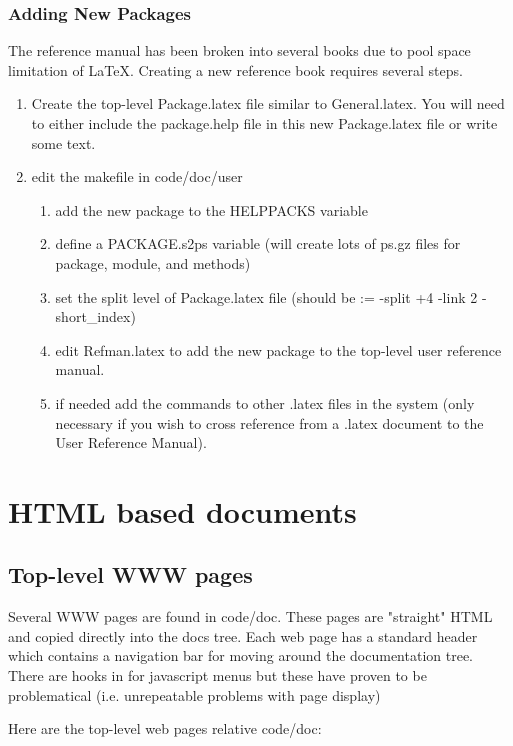 \subsubsection{Adding New Packages}
The reference manual has been broken into several books due to pool space limitation of
LaTeX.  Creating a new reference book requires several steps.
\begin{enumerate}
\item Create the top-level Package.latex file similar to General.latex. You will need to either
include the package.help file in this new Package.latex file or write some text.
\item edit the makefile in code/doc/user
\begin{enumerate}
 \item add the new package to the HELPPACKS variable
\item define a PACKAGE.s2ps variable (will create lots of ps.gz files for package, module,
and methods)
\item set the split level of Package.latex file (should be := -split +4 -link 2 -short\_index)
\item edit Refman.latex to add the new package to the top-level user reference manual.
\item if needed add the \externallabels commands to other .latex files in the system (only
necessary if you wish to cross reference from a .latex document to the User Reference Manual).
\end{enumerate}
\end{enumerate}



\section{HTML based documents}
\subsection{Top-level WWW pages}
Several WWW pages are found in code/doc.  These pages are "straight" HTML
and copied directly into the docs tree.  Each \aips web page has a standard header
which contains a navigation bar for moving around the documentation tree. There are hooks in
for javascript menus but these have proven to be problematical (i.e. unrepeatable problems with
page display)

Here are the top-level \aips web pages relative code/doc:

